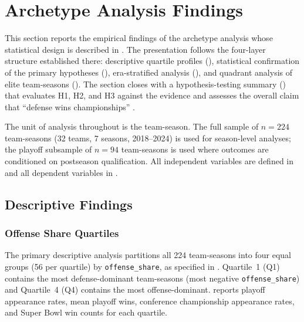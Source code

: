 \section{Archetype Analysis Findings}
\label{sec:archetype-findings}

This section reports the empirical findings of the archetype analysis whose
statistical design is described in . The
presentation follows the four-layer structure established there: descriptive
quartile profiles (), statistical confirmation
of the primary hypotheses (), era-stratified
analysis (), and quadrant analysis of elite team-seasons
(). The section closes with a hypothesis-testing
summary () that evaluates H1, H2, and H3 against
the evidence and assesses the overall claim that ``defense wins championships''
\parencite{robst2011defense}.

The unit of analysis throughout is the team-season. The full sample of
$n = 224$ team-seasons (32 teams, 7 seasons, 2018--2024) is used for
season-level analyses; the playoff subsample of $n = 94$ team-seasons is used
where outcomes are conditioned on postseason qualification. All independent
variables are defined in  and all dependent variables in
.

\subsection{Descriptive Findings}
\label{sec:descriptive-findings}

\subsubsection{Offense Share Quartiles}
\label{sec:offense-share-quartiles}

The primary descriptive analysis partitions all 224 team-seasons into four
equal groups (56 per quartile) by \texttt{offense\_share}, as specified in
. Quartile~1 (Q1) contains the most
defense-dominant team-seasons (most negative \texttt{offense\_share}) and
Quartile~4 (Q4) contains the most offense-dominant. 
reports playoff appearance rates, mean playoff wins, conference championship
appearance rates, and Super Bowl win counts for each quartile.

